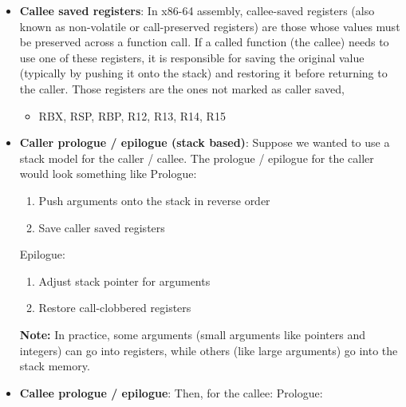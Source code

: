 \documentclass{report}
\begin{document}
\begin{itemize}
                \bigbreak \noindent 
                Those registers are
                \begin{itemize}
                    \item RAX, RCX, RDX, RSI, RDI, R8, R9, R10, R11
                    \item XMM0 – XMM15
                \end{itemize}
            \item \textbf{Callee saved registers}: In x86-64 assembly, callee-saved registers (also known as non-volatile or call-preserved registers) are those whose values must be preserved across a function call. If a called function (the callee) needs to use one of these registers, it is responsible for saving the original value (typically by pushing it onto the stack) and restoring it before returning to the caller. 
                \bigbreak \noindent 
                Those registers are the ones not marked as caller saved, 
                \begin{itemize}
                    \item RBX, RSP, RBP, R12, R13, R14, R15
                \end{itemize}
            \item \textbf{Caller prologue / epilogue (stack based)}: Suppose we wanted to use a stack model for the caller / callee. The prologue / epilogue for the caller would look something like
                \bigbreak \noindent 
                Prologue:
                \begin{enumerate}
                    \item Push arguments onto the stack in reverse order
                    \item Save caller saved registers
                \end{enumerate}
                Epilogue:
                \begin{enumerate}
                    \item Adjust stack pointer for arguments
                    \item Restore call-clobbered registers
                \end{enumerate}
                \textbf{Note:} In practice, some arguments (small arguments like pointers and integers) can go into registers, while others (like large arguments) go into the stack memory.
            \item \textbf{Callee prologue / epilogue}: Then, for the callee:
                \bigbreak \noindent 
                Prologue:

\end{itemize}
\end{document}
